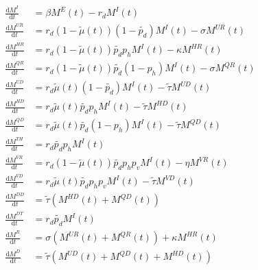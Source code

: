\documentclass[msom,blindrev]{informs3} %
\makeatletter
\let\normalsize\relax
\let\@currsize\normalsize
\makeatother
\begin{document}
\begin{APPENDICES}
\begin{align*}
\frac{\mathrm{d} M^I}{\mathrm{d} t} &= \beta M^E(t)-r_d M^I(t) \\
\frac{\mathrm{d} M^{UR}}{\mathrm{d} t} &= r_d(1-\widetilde{\mu}(t))(1-\widetilde{p_d})M^I(t) - \sigma M^{UR}(t) \\
\frac{\mathrm{d} M^{HR}}{\mathrm{d} t} &= r_d(1-\widetilde{\mu}(t))\widetilde{p_d} p_h M^I(t) - \kappa M^{HR}(t) \\
\frac{\mathrm{d} M^{QR}}{\mathrm{d} t} &= r_d(1-\widetilde{\mu}(t))\widetilde{p_d} (1-p_h) M^I(t) - \sigma M^{QR}(t) \\
\frac{\mathrm{d} M^{UD}}{\mathrm{d} t} &= r_d \widetilde{\mu}(t) (1-\widetilde{p_d}) M^I(t) - \widetilde{\tau} M^{UD}(t)\\
\frac{\mathrm{d} M^{HD}}{\mathrm{d} t} &= r_d \widetilde{\mu}(t) \widetilde{p_d} p_h M^I(t) - \widetilde{\tau} M^{HD}(t) \\
\frac{\mathrm{d} M^{QD}}{\mathrm{d} t} &= r_d \widetilde{\mu}(t) \widetilde{p_d} (1-p_h) M^I(t) - \widetilde{\tau} M^{QD}(t) \\
\frac{\mathrm{d} M^{TH}}{\mathrm{d} t} &= r_d \widetilde{p_d} p_h M^I(t) \\
\frac{\mathrm{d} M^{VR}}{\mathrm{d} t} &= r_d(1-\widetilde{\mu}(t))\widetilde{p_d} p_h p_v M^I(t) - \eta M^{VR}(t) \\
\frac{\mathrm{d} M^{VD}}{\mathrm{d} t} &= r_d \widetilde{\mu}(t)\widetilde{p_d} p_h p_v M^I(t) - \widetilde{\tau} M^{VD}(t) \\
\frac{\mathrm{d} M^{DD}}{\mathrm{d} t} &= \widetilde{\tau} (M^{HD}(t) + M^{QD}(t)) \\
\frac{\mathrm{d} M^{DT}}{\mathrm{d} t} &= r_d \widetilde{p_d} M^I(t) \\
\frac{\mathrm{d} M^R}{\mathrm{d} t} &= \sigma(M^{UR}(t)+M^{QR}(t))+\kappa M^{HR}(t)\\
\frac{\mathrm{d} M^D}{\mathrm{d} t} &= \widetilde{\tau}(M^{UD}(t)+M^{QD}(t)+M^{HD}(t))
\end{align*}

\makeatletter
\let\normalsize\relax
\let\@currsize\normalsize
\makeatother

\begin{figure}[t]
\centering
{}
\end{figure}
\end{APPENDICES}
\end{document}
